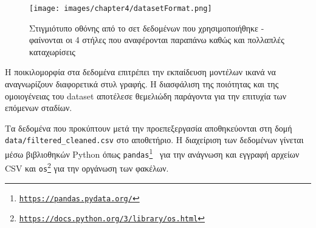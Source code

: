 \begin{figure}[H]
    \centering
    \texttt{[image: images/chapter4/datasetFormat.png]}
    \caption{Στιγμιότυπο οθόνης από το σετ δεδομένων που χρησιμοποιήθηκε - φαίνονται οι 4 στήλες που αναφέρονται παραπάνω καθώς και πολλαπλές καταχωρίσεις}
    \label{fig:chapter4_datasetFormat}
\end{figure}

Η ποικιλομορφία στα δεδομένα επιτρέπει την εκπαίδευση μοντέλων ικανά να αναγνωρίζουν διαφορετικά στυλ γραφής. Η διασφάλιση της ποιότητας και της ομοιογένειας του dataset αποτέλεσε θεμελιώδη παράγοντα για την επιτυχία των επόμενων σταδίων.

Τα δεδομένα που προκύπτουν μετά την προεπεξεργασία αποθηκεύονται στη δομή \texttt{data/filtered\_cleaned.csv} στο αποθετήριο. Η διαχείριση των δεδομένων γίνεται μέσω βιβλιοθηκών Python όπως \texttt{pandas\footnote{\url{https://pandas.pydata.org/}}
} για την ανάγνωση και εγγραφή αρχείων CSV και \texttt{os\footnote{\url{https://docs.python.org/3/library/os.html}}} για την οργάνωση των φακέλων.


